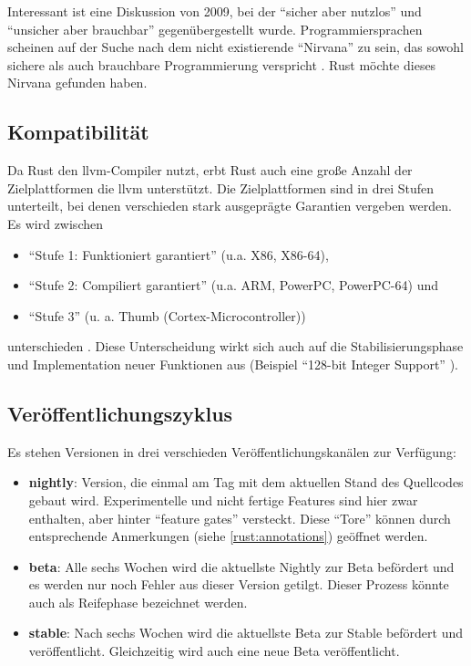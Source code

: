 Interessant ist eine Diskussion von 2009, bei der \enquote{sicher aber nutzlos} und \enquote{unsicher aber brauchbar} gegenübergestellt wurde.
Programmiersprachen scheinen auf der Suche nach dem nicht existierende \enquote{Nirvana} zu sein, das sowohl sichere als auch brauchbare Programmierung verspricht \cite[ab ca Minute 58:20]{rust:infoq:null}.
Rust möchte dieses Nirvana gefunden haben.

\subsection{Kompatibilität}
Da Rust den \gls{llvm}-Compiler nutzt, erbt Rust auch eine große Anzahl der Zielplattformen die \gls{llvm} unterstützt.
Die Zielplattformen sind in drei Stufen unterteilt, bei denen verschieden stark ausgeprägte Garantien vergeben werden. Es wird zwischen
\begin{itemize}
	\item \enquote{Stufe 1: Funktioniert garantiert} (u.a. X86, X86-64),
	\item \enquote{Stufe 2: Compiliert garantiert} (u.a. ARM, PowerPC, PowerPC-64) und
	\item \enquote{Stufe 3} (u. a. Thumb (Cortex-Microcontroller))
\end{itemize}
unterschieden \cite{rust:platform_support}.
Diese Unterscheidung wirkt sich auch auf die Stabilisierungsphase und Implementation neuer Funktionen aus (Beispiel \enquote{128-bit Integer Support} \cite{rust:github:128bit_integer}).

\subsection{Veröffentlichungszyklus}
\label{rust:feature_gates}

Es stehen Versionen in drei verschieden Veröffentlichungskanälen zur Verfügung:
\begin{itemize}
	\item \textbf{nightly}:
	Version, die einmal am Tag mit dem aktuellen Stand des Quellcodes gebaut wird.
	Experimentelle und nicht fertige Features sind hier zwar enthalten, aber hinter \enquote{feature gates} versteckt.
	Diese \enquote{Tore} können durch entsprechende Anmerkungen (siehe \autoref{rust:annotations}) geöffnet werden.%
	
	\item \textbf{beta}: Alle sechs Wochen wird die aktuellste Nightly zur Beta befördert und es werden nur noch Fehler aus dieser Version getilgt.
	Dieser Prozess könnte auch als Reifephase bezeichnet werden.
	\item \textbf{stable}: Nach sechs Wochen wird die aktuellste Beta zur Stable befördert und veröffentlicht.
	Gleichzeitig wird auch eine neue Beta veröffentlicht.
\end{itemize}

